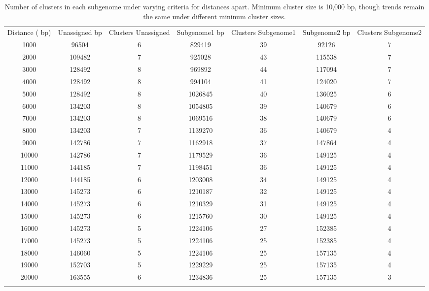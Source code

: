 \clearpage
\begin{table}[h!]
\label{supp.vartandem} 
\caption{Number of clusters in each subgenome under varying criteria for distances apart.  Minimum cluster size is 10,000 bp, though trends remain the same under different mininum cluster sizes.}\label{supp.adjustclust} 
\begin{tabular}{ccccccc}
\hline\noalign{\smallskip}
Distance ( bp) &  Unassigned  bp &  Clusters Unassigned &  Subgenome1  bp &  Clusters Subgenome1 & Subgenome2  bp &  Clusters Subgenome2 \\\noalign{\smallskip}\hline\noalign{\smallskip}				
1000 & 96504 & 6 & 829419 & 39 & 92126 & 7\\
2000 & 109482 & 7 & 925028 & 43 & 115538 & 7\\
3000 & 128492 & 8 & 969892 & 44 & 117094 & 7\\
4000 & 128492 & 8 & 994104 & 41 & 124020 & 7\\
5000 & 128492 & 8 & 1026845 & 40 & 136025 & 6\\
6000 & 134203 & 8 & 1054805 & 39 & 140679 & 6\\
7000 & 134203 & 8 & 1069516 & 38 & 140679 & 6\\
8000 & 134203 & 7 & 1139270 & 36 & 140679 & 4\\
9000 & 142786 & 7 & 1162918 & 37 & 147864 & 4\\
10000 & 142786 & 7 & 1179529 & 36 & 149125 & 4\\
11000 & 144185 & 7 & 1198451 & 36 & 149125 & 4\\
12000 & 144185 & 6 & 1203008 & 34 & 149125 & 4\\
13000 & 145273 & 6 & 1210187 & 32 & 149125 & 4\\
14000 & 145273 & 6 & 1210329 & 31 & 149125 & 4\\
15000 & 145273 & 6 & 1215760 & 30 & 149125 & 4\\
16000 & 145273 & 5 & 1224106 & 27 & 152385 & 4\\
17000 & 145273 & 5 & 1224106 & 25 & 152385 & 4\\
18000 & 146060 & 5 & 1224106 & 25 & 157135 & 4\\
19000 & 152703 & 5 & 1229229 & 25 & 157135 & 4\\
20000 & 163555 & 6 & 1234836 & 25 & 157135 & 3\\
\noalign{\smallskip}\hline
\end{tabular}
\end{table}



